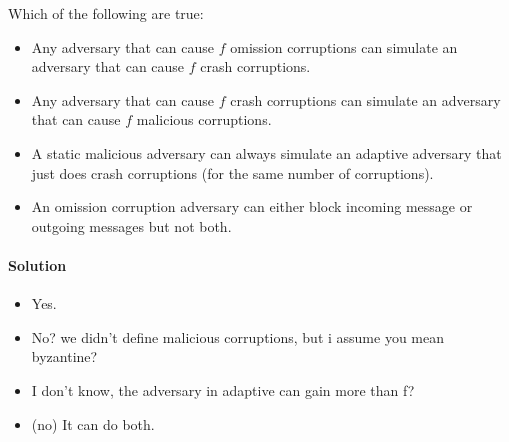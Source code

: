 \begin{xca}[Quiz 1.H]
    Which of the following are true:
    \begin{itemize} 
\item Any adversary that can cause $f$ omission corruptions can simulate an adversary that
 can cause $f$ crash corruptions.
\item  Any adversary that can cause $f$ crash corruptions can simulate an adversary that 
can cause $f$ malicious corruptions.
\item  A static malicious adversary can always simulate an adaptive 
adversary that just does crash corruptions (for the same number of corruptions).
\item  An omission corruption adversary can either block incoming message or outgoing messages but not both.
    \end{itemize}
    
\paragraph{Solution}
\begin{itemize}
    \item Yes.
    \item No? we didn't define malicious corruptions, but i assume you mean byzantine?
    \item I don't know, the adversary in adaptive can gain more than f? 
    \item (no) It can do both.
\end{itemize}
\end{xca}


